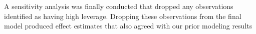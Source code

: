 \documentclass[a4paper]{article}                %
\begin{document}
        A sensitivity analysis was finally conducted that dropped any observations identified as having high leverage. Dropping these observations from the final model produced effect estimates that also agreed with our prior modeling results

















\end{document}
